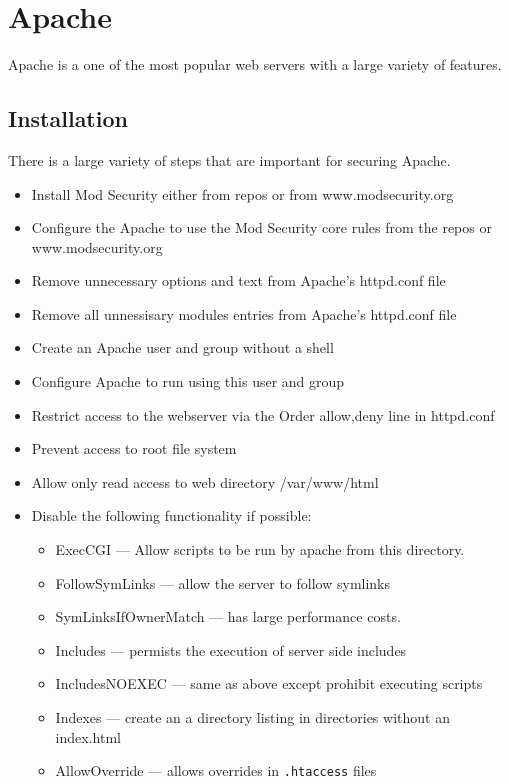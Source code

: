 \section{Apache}

Apache is a one of the most popular web servers with a large variety of features.

\subsection{Installation}
There is a large variety of steps that are important for securing Apache.
\begin{itemize}
	\item Install Mod Security either from repos or from www.modsecurity.org
	\item Configure the Apache to use the Mod Security core rules from the repos or www.modsecurity.org
	\item Remove unnecessary options and text from Apache's httpd.conf file
	\item Remove all unnessisary modules entries from Apache's httpd.conf file
	\item Create an Apache user and group without a shell
	\item Configure Apache to run using this user and group
	\item Restrict access to the webserver via the Order allow,deny line in httpd.conf
	\item Prevent access to root file system
	\item Allow only read access to web directory /var/www/html
	\item Disable the following functionality if possible:
		\begin{itemize}
			\item ExecCGI --- Allow scripts to be run by apache from this directory.
			\item FollowSymLinks --- allow the server to follow symlinks
			\item SymLinksIfOwnerMatch --- has large performance costs.
			\item Includes --- permists the execution of server side includes
			\item IncludesNOEXEC --- same as above except prohibit executing scripts
			\item Indexes --- create an a directory listing in directories without an index.html
			\item AllowOverride --- allows overrides in \lstinline|.htaccess| files

\end{itemize}
\end{itemize}

